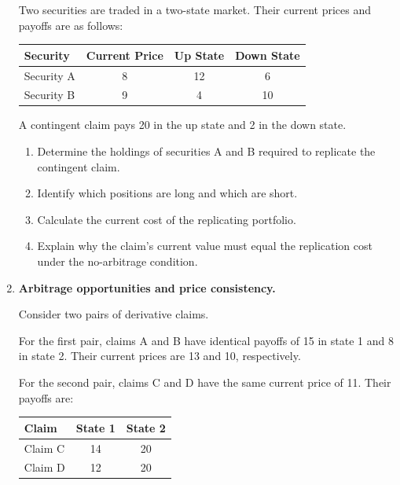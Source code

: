 \begin{enumerate}
Two securities are traded in a two-state market.
Their current prices and payoffs are as follows:

\begin{center}
\begin{tabular}{lccc}
\toprule
\textbf{Security}
& \textbf{Current Price}
& \textbf{Up State}
& \textbf{Down State} \\
\midrule
Security A & 8 & 12 & 6 \\
Security B & 9 & 4 & 10 \\
\bottomrule
\end{tabular}
\end{center}

A contingent claim pays 20 in the up state and
2 in the down state.

\begin{enumerate}

\item Determine the holdings of securities A
and B required to replicate the contingent claim.

\item Identify which positions are long and
which are short.

\item Calculate the current cost of the
replicating portfolio.

\item Explain why the claim's current value
must equal the replication cost under the
no-arbitrage condition.

\end{enumerate}


\item \textbf{Arbitrage opportunities and price consistency.}

Consider two pairs of derivative claims.

For the first pair, claims A and B have identical
payoffs of 15 in state 1 and 8 in state 2. Their
current prices are 13 and 10, respectively.

For the second pair, claims C and D have the
same current price of 11. Their payoffs are:

\begin{center}
\begin{tabular}{lcc}
\toprule
\textbf{Claim}
& \textbf{State 1}
& \textbf{State 2} \\
\midrule
Claim C & 14 & 20 \\
Claim D & 12 & 20 \\
\bottomrule
\end{tabular}
\end{center}


\end{enumerate}
